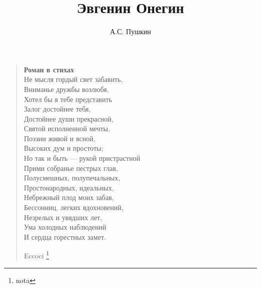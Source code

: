 \documentclass{book}
\title{Эвгенин Онегин}
\author{А.С. Пушкин}
\date{}
\newcommand{\ftn}{\footnote}%
\begin{document}
\maketitle

\begin{verse}
\textbf{Роман в стихах}\\
Не мысля гордый свет забавить,\\
Вниманье дружбы возлюбя,\\
Хотел бы я тебе представить\\
Залог достойнее тебя,\\
Достойнее души прекрасной,\\
Святой исполненной мечты,\\
Поэзии живой и ясной,\\
Высоких дум и простоты;\\
Но так и быть — рукой пристрастной\\
Прими собранье пестрых глав,\\
Полусмешных, полупечальных,\\
Простонародных, идеальных,\\
Небрежный плод моих забав,\\
Бессонниц, легких вдохновений,\\
Незрелых и увядших лет,\\
Ума холодных наблюдений\\
И сердца горестных замет.




Eccoci \ftn{nota}





%
%
%
%
%
%

%

\end{verse}
\end{document}

